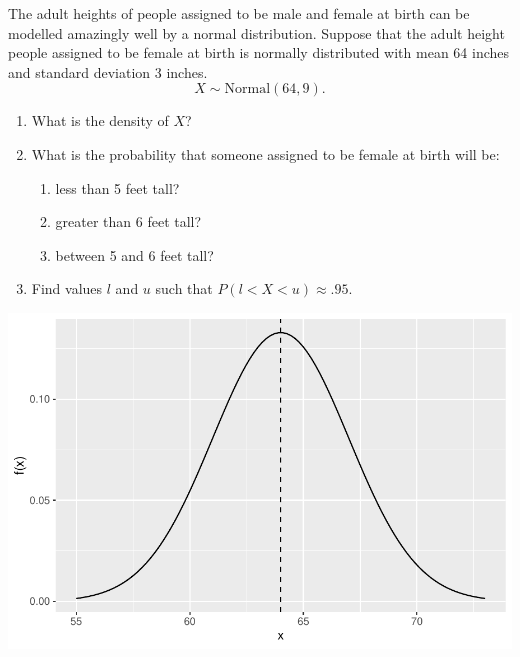 \begin{frame}
  \begin{block}{\example}
    The adult heights of people assigned to be male and female at birth can be modelled amazingly well by a normal distribution. Suppose that the adult height people assigned to be female at birth is normally distributed with mean 64 inches and standard deviation 3 inches.
    \[
      X \sim \mbox{Normal}(64,9).
    \]
    
    \begin{enumerate}[label=\alph*),start=1]
    \item What is the density of $X$?
    \item What is the probability that someone assigned to be female at birth will be:
      \begin{enumerate}[label=\roman*),start=1]
      \item less than 5 feet tall? 
      \item greater than 6 feet tall?
      \item between 5 and 6 feet tall?
      \end{enumerate}
    \item Find values $l$ and $u$ such that $P(l < X < u) \approx .95$. 
    \end{enumerate}
  \end{block}
\end{frame}




\begin{frame}

  \begin{block}{\examplectd}
  \begin{center}
    \includegraphics[height = .8\textheight]{figure/exercise-20-1}
  \end{center}
  \end{block}
  
\end{frame}

